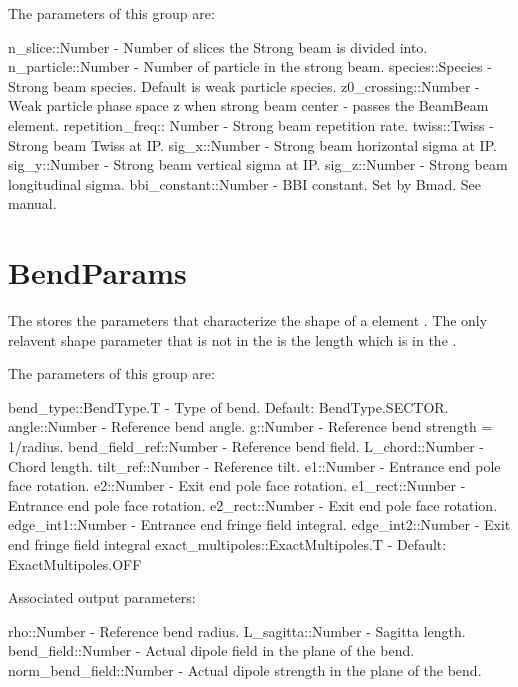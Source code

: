 The parameters of this group are:
\begin{example}
  n_slice::Number           - Number of slices the Strong beam is divided into.
  n_particle::Number        - Number of particle in the strong beam.
  species::Species          - Strong beam species. Default is weak particle species.
  z0_crossing::Number       - Weak particle phase space z when strong beam center
                            -   passes the BeamBeam element.
  repetition_freq:: Number  - Strong beam repetition rate.
  twiss::Twiss              - Strong beam Twiss at IP.
  sig_x::Number             - Strong beam horizontal sigma at IP.
  sig_y::Number             - Strong beam vertical sigma at IP.
  sig_z::Number             - Strong beam longitudinal sigma.
  bbi_constant::Number      - BBI constant. Set by Bmad. See manual.
\end{example}

\section{BendParams}
\label{s:bend.g}

The  stores the parameters that characterize the shape of a  element
. The only relavent shape parameter that is not in the  is the
length  which is in the .

The parameters of this group are:
\begin{example}
  bend_type::BendType.T     - Type of bend. Default: BendType.SECTOR.
  angle::Number             - Reference bend angle.
  g::Number                 - Reference bend strength = 1/radius.
  bend_field_ref::Number    - Reference bend field.
  L_chord::Number           - Chord length.
  tilt_ref::Number          - Reference tilt.
  e1::Number                - Entrance end pole face rotation.
  e2::Number                - Exit end pole face rotation.
  e1_rect::Number           - Entrance end pole face rotation.
  e2_rect::Number           - Exit end pole face rotation.
  edge_int1::Number         - Entrance end fringe field integral.
  edge_int2::Number         - Exit end fringe field integral
  exact_multipoles::ExactMultipoles.T  - Default: ExactMultipoles.OFF
\end{example}


Associated output parameters:
\begin{example}
  rho::Number             - Reference bend radius.
  L_sagitta::Number       - Sagitta length.
  bend_field::Number      - Actual dipole field in the plane of the bend.
  norm_bend_field::Number - Actual dipole strength in the plane of the bend.
\end{example}

